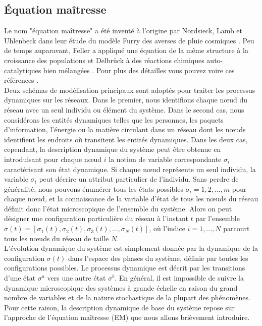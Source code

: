 \subsection{Équation maîtresse}
 
 
 
 
Le nom "équation maîtresse" a été inventé à l'origine par Nordsieck, Lamb et Uhlenbeck \cite{Nordsieck-al1940} dans leur étude du modèle Furry des averses de pluie cosmiques \cite{Furry1937}. Peu de temps auparavant, Feller a appliqué une équation de la même structure à la croissance des populations \cite{Feller1939} et Delbrück à des réactions chimiques auto-catalytiques bien mélangées \cite{Delbruck1940}. Pour plus des détailles vous pouvez voire ces références \cite{Kampen2007,Gardiner2009,Weber-Frey2017}.\\
Deux schémas de modélisation principaux sont adoptés pour traiter les processus dynamiques sur les réseaux. Dans le premier, nous identifions chaque nœud du réseau avec un seul individu ou élément du système. Dans le second cas, nous considérons les entités dynamiques telles que les personnes, les paquets d'information, l'énergie ou la matière circulant dans un réseau dont les nœuds identifient les endroits où transitent les entités dynamiques. Dans les deux cas, cependant, la description dynamique du système peut être obtenue en introduisant pour chaque nœud $i$ la notion de variable correspondante $\sigma_i$ caractérisant son état dynamique. Si chaque nœud représente un seul individu, la variable $\sigma_i$ peut décrire un attribut particulier de l'individu.
Sans perdre de généralité, nous pouvons énumérer tous les états possibles $\sigma_i=1, 2,. . ., m$ pour chaque nœud, et la connaissance de la variable d'état de tous les nœuds du réseau définit donc l'état microscopique de l'ensemble du système. Alors on peut désigner une configuration particulière du réseau à l'instant $t$ par l'ensemble $\sigma(t)=[\sigma_1(t),\sigma_2(t),\sigma_3(t), ...,\sigma_N(t)]$, où l'indice $i = 1,. . ., N$ parcourt tous les nœuds du réseau de taille $N$.\\
L'évolution dynamique du système est simplement donnée par la dynamique de la configuration $\sigma(t)$ dans l'espace des phases du système, définie par toutes les configurations possibles. Le processus dynamique est décrit par les transitions d'une état $\sigma^a$ vers une autre état $\sigma^b$. En général, il est impossible de suivre la dynamique microscopique des systèmes à grande échelle en raison du grand nombre de variables et de la nature stochastique de la plupart des phénomènes. Pour cette raison, la description dynamique de base du système repose sur l'approche de l'équation maîtresse (EM) que nous allons brièvement introduire.\\
